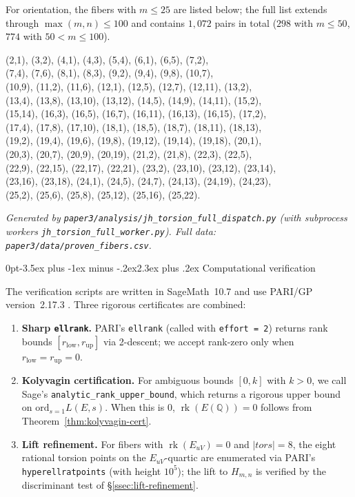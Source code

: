 \documentclass[12pt,a4paper,reqno]{amsart}
\makeatletter
\renewcommand{\section}{\@startsection{section}{1}%
  {0pt}{-3.5ex plus -1ex minus -.2ex}{2.3ex plus .2ex}%
  {\normalfont\large\bfseries}}
\theoremstyle{plain}
\theoremstyle{definition}
\theoremstyle{remark}
\newcommand{\Q}{\mathbb{Q}}
\newcommand{\HC}{H_{m,n}}
\newcommand{\rk}{\operatorname{rk}}
\makeatother
\begin{document}
For orientation, the fibers with $m \le 25$ are listed below; the full list extends through $\max(m, n) \le 100$ and contains $1{,}072$ pairs in total ($298$ with $m \le 50$, $774$ with $50 < m \le 100$).

\begin{small}
\noindent
(2,1), (3,2), (4,1), (4,3), (5,4), (6,1), (6,5), (7,2), \\
(7,4), (7,6), (8,1), (8,3), (9,2), (9,4), (9,8), (10,7), \\
(10,9), (11,2), (11,6), (12,1), (12,5), (12,7), (12,11), (13,2), \\
(13,4), (13,8), (13,10), (13,12), (14,5), (14,9), (14,11), (15,2), \\
(15,14), (16,3), (16,5), (16,7), (16,11), (16,13), (16,15), (17,2), \\
(17,4), (17,8), (17,10), (18,1), (18,5), (18,7), (18,11), (18,13), \\
(19,2), (19,4), (19,6), (19,8), (19,12), (19,14), (19,18), (20,1), \\
(20,3), (20,7), (20,9), (20,19), (21,2), (21,8), (22,3), (22,5), \\
(22,9), (22,15), (22,17), (22,21), (23,2), (23,10), (23,12), (23,14), \\
(23,16), (23,18), (24,1), (24,5), (24,7), (24,13), (24,19), (24,23), \\
(25,2), (25,6), (25,8), (25,12), (25,16), (25,22).
\end{small}

\noindent\textit{Generated by \texttt{paper3/analysis/jh\_torsion\_full\_dispatch.py} (with subprocess workers \texttt{jh\_torsion\_full\_worker.py}). Full data: \texttt{paper3/data/proven\_fibers.csv}.}

\section{Computational verification}
\label{app:code}

The verification scripts are written in SageMath~10.7 \cite{sage} and use PARI/GP version~2.17.3 \cite{pari}. Three rigorous certificates are combined:

\begin{enumerate}[label=(\arabic*),leftmargin=2em]
  \item \textbf{Sharp \texttt{ellrank}.} PARI's \texttt{ellrank} (called with \texttt{effort = 2}) returns rank bounds $[r_{\mathrm{low}}, r_{\mathrm{up}}]$ via 2-descent; we accept rank-zero only when $r_{\mathrm{low}} = r_{\mathrm{up}} = 0$.
  \item \textbf{Kolyvagin certification.} For ambiguous bounds $[0, k]$ with $k > 0$, we call Sage's \texttt{analytic\_rank\_upper\_bound}, which returns a rigorous upper bound on $\mathrm{ord}_{s=1} L(E, s)$. When this is $0$, $\rk(E(\Q)) = 0$ follows from Theorem~\ref{thm:kolyvagin-cert}.
  \item \textbf{Lift refinement.} For fibers with $\rk(E_{uV}) = 0$ and $|tors| = 8$, the eight rational torsion points on the $E_{uV}$-quartic are enumerated via PARI's \texttt{hyperellratpoints} (with height $10^5$); the lift to $\HC$ is verified by the discriminant test of \S\ref{ssec:lift-refinement}.
\end{enumerate}
\end{document}
